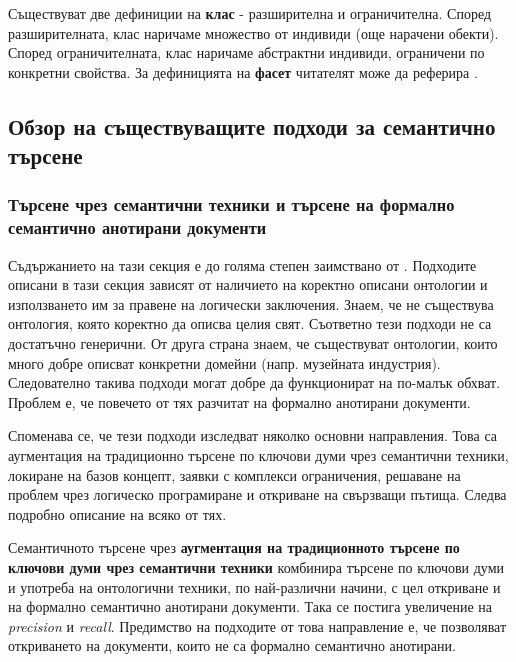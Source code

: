 \documentclass[a4paper,12pt]{article}
\begin{document}
\bigbreak

Съществуват две дефиниции на \textbf{клас} - разширителна и ограничителна. Според разширителната, клас наричаме множество от индивиди (още нарачени обекти). Според ограничителната, клас наричаме абстрактни индивиди, ограничени по конкретни свойства. За дефиницията на \textbf{фасет} читателят може да реферира \cite{facets}.

\subsection{Обзор на съществуващите подходи за семантично търсене}

\subsubsection{Търсене чрез семантични техники и търсене на формално семантично анотирани документи}

Съдържанието на тази секция е до голяма степен заимствано от \cite{semanticsearchsurvey}. Подходите описани в тази секция зависят от наличието на коректно описани онтологии и използването им за правене на логически заключения. Знаем, че не съществува онтология, която коректно да описва целия свят. Съответно тези подходи не са достатъчно генерични. От друга страна знаем, че съществуват онтологии, които много добре описват конкретни домейни (напр. музейната индустрия). Следователно такива подходи могат добре да функционират на по-малък обхват. Проблем е, че повечето от тях разчитат на формално анотирани документи.

\bigbreak

Споменава се, че тези подходи изследват няколко основни направления. Това са аугментация на традиционно търсене по ключови думи чрез семантични техники, локиране на базов концепт, заявки с комплекси ограничения, решаване на проблем чрез логическо програмиране и откриване на свързващи пътища. Следва подробно описание на всяко от тях.

\bigbreak

Семантичното търсене чрез \textbf{аугментация на традиционното търсене по ключови думи чрез семантични техники} комбинира търсене по ключови думи и употреба на онтологични техники, по най-различни начини, с цел откриване и на формално семантично анотирани документи. Така се постига увеличение на \textit{precision} и \textit{recall}. Предимство на подходите от това направление е, че позволяват откриването на документи, които не са формално семантично анотирани.
\end{document}
